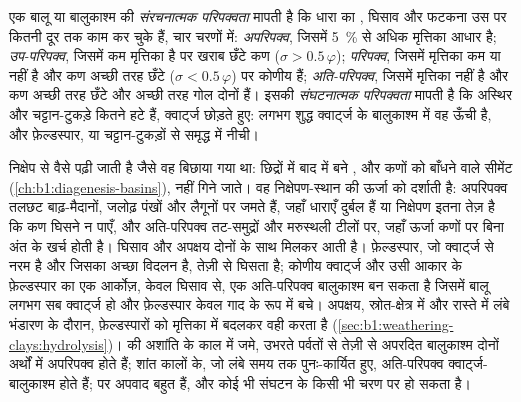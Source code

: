 \begin{definition}\label{def:b1:clastic-sediments:maturity}
एक बालू या बालुकाश्म की \emph{संरचनात्मक परिपक्वता} मापती है कि धारा का , घिसाव और फटकना उस पर कितनी दूर तक काम कर चुके हैं, चार चरणों में: \emph{अपरिपक्व}, जिसमें \qty{5}{\percent} से अधिक मृत्तिका आधार है; \emph{उप-परिपक्व}, जिसमें कम मृत्तिका है पर खराब छँटे कण ($\sigma > 0.5\,\varphi$); \emph{परिपक्व}, जिसमें मृत्तिका कम या नहीं है और कण अच्छी तरह छँटे ($\sigma < 0.5\,\varphi$) पर कोणीय हैं; \emph{अति-परिपक्व}, जिसमें मृत्तिका नहीं है और कण अच्छी तरह छँटे और अच्छी तरह गोल दोनों हैं। इसकी \emph{संघटनात्मक परिपक्वता} मापती है कि अस्थिर  और चट्टान-टुकड़े कितने हटे हैं, क्वार्ट्ज छोड़ते हुए: लगभग शुद्ध क्वार्ट्ज के बालुकाश्म में वह ऊँची है, और फ़ेल्डस्पार,  या चट्टान-टुकड़ों से समृद्ध में नीची।
\end{definition}

 निक्षेप से वैसे पढ़ी जाती है जैसे वह बिछाया गया था: छिद्रों में बाद में बने , और कणों को बाँधने वाले सीमेंट (\cref{ch:b1:diagenesis-basins}), नहीं गिने जाते। वह निक्षेपण-स्थान की ऊर्जा को दर्शाती है: अपरिपक्व तलछट बाढ़-मैदानों, जलोढ़ पंखों और लैगूनों पर जमते हैं, जहाँ धाराएँ दुर्बल हैं या निक्षेपण इतना तेज़ है कि कण घिसने न पाएँ, और अति-परिपक्व तट-समुद्रों और मरुस्थली टीलों पर, जहाँ ऊर्जा कणों पर बिना अंत के खर्च होती है।  घिसाव और अपक्षय दोनों के साथ मिलकर आती है। फ़ेल्डस्पार, जो क्वार्ट्ज से नरम है और जिसका अच्छा विदलन है, तेज़ी से घिसता है; कोणीय क्वार्ट्ज और उसी आकार के फ़ेल्डस्पार का एक आर्कोज़, केवल घिसाव से, एक अति-परिपक्व बालुकाश्म बन सकता है जिसमें बालू लगभग सब क्वार्ट्ज हो और फ़ेल्डस्पार केवल गाद के रूप में बचे। अपक्षय, स्रोत-क्षेत्र में और रास्ते में लंबे भंडारण के दौरान, फ़ेल्डस्पारों को मृत्तिका में बदलकर वही करता है (\cref{sec:b1:weathering-clays:hydrolysis})।  की अशांति के काल में जमे, उभरते पर्वतों से तेज़ी से अपरदित बालुकाश्म दोनों अर्थों में अपरिपक्व होते हैं; शांत कालों के, जो लंबे समय तक पुनः-कार्यित हुए, अति-परिपक्व क्वार्ट्ज-बालुकाश्म होते हैं; पर अपवाद बहुत हैं, और कोई भी संघटन  के किसी भी चरण पर हो सकता है।


